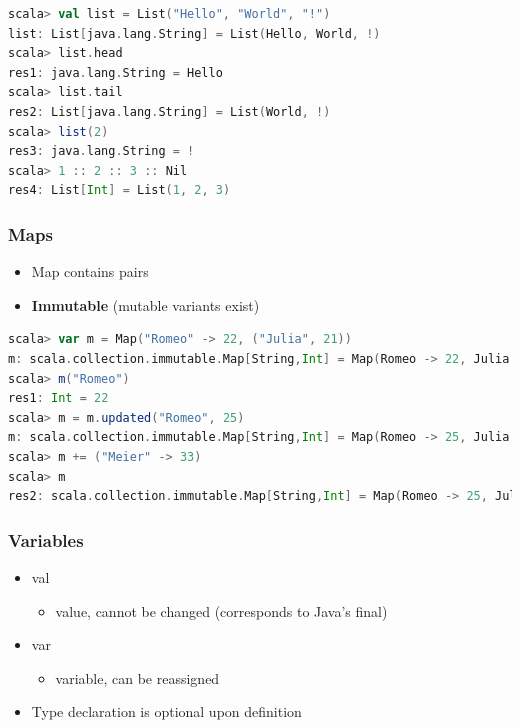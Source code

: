 \begin{lstlisting}[language=scala]
scala> val list = List("Hello", "World", "!")
list: List[java.lang.String] = List(Hello, World, !)
scala> list.head
res1: java.lang.String = Hello
scala> list.tail
res2: List[java.lang.String] = List(World, !)
scala> list(2)
res3: java.lang.String = !
scala> 1 :: 2 :: 3 :: Nil
res4: List[Int] = List(1, 2, 3)
\end{lstlisting}

\hypertarget{maps}{%
\subsubsection{Maps}\label{maps}}

\begin{itemize}
\tightlist
\item
  Map contains pairs
\item
  \textbf{Immutable} (mutable variants exist)
\end{itemize}

\begin{lstlisting}[language=scala]
scala> var m = Map("Romeo" -> 22, ("Julia", 21))
m: scala.collection.immutable.Map[String,Int] = Map(Romeo -> 22, Julia -> 21)
scala> m("Romeo")
res1: Int = 22
scala> m = m.updated("Romeo", 25)
m: scala.collection.immutable.Map[String,Int] = Map(Romeo -> 25, Julia -> 21)
scala> m += ("Meier" -> 33)
scala> m
res2: scala.collection.immutable.Map[String,Int] = Map(Romeo -> 25, Julia -> 21, Meier -> 33)
\end{lstlisting}

\hypertarget{variables}{%
\subsubsection{Variables}\label{variables}}

\begin{itemize}
\tightlist
\item
  val

  \begin{itemize}
  \tightlist
  \item
    value, cannot be changed (corresponds to Java's final)
  \end{itemize}
\item
  var

  \begin{itemize}
  \tightlist
  \item
    variable, can be reassigned
  \end{itemize}
\item
  Type declaration is optional upon definition
\end{itemize}

